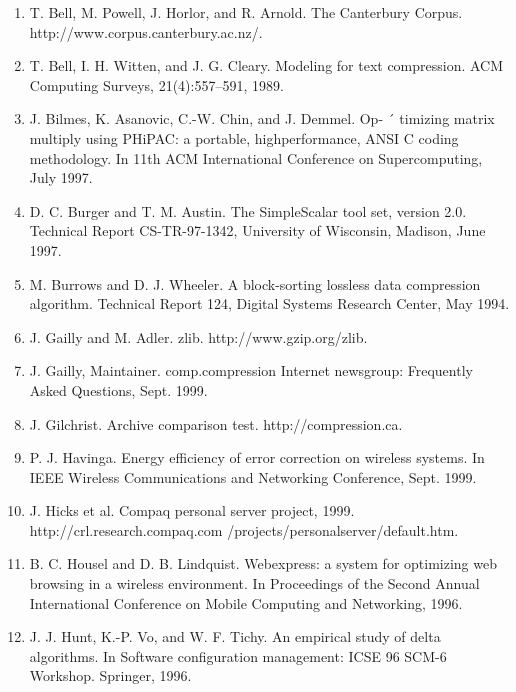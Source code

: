 \documentclass{article}
\begin{document}
\begin{enumerate}
	\item T. Bell, M. Powell, J. Horlor, and R. Arnold. The Canterbury Corpus. http://www.corpus.canterbury.ac.nz/.

	\item T. Bell, I. H. Witten, and J. G. Cleary. Modeling for text
	compression. ACM Computing Surveys, 21(4):557–591,
	1989.

	\item J. Bilmes, K. Asanovic, C.-W. Chin, and J. Demmel. Op- ´
	timizing matrix multiply using PHiPAC: a portable, highperformance, ANSI C coding methodology. In 11th ACM
	International Conference on Supercomputing, July 1997.
	
	\item D. C. Burger and T. M. Austin. The SimpleScalar tool
	set, version 2.0. Technical Report CS-TR-97-1342, University of Wisconsin, Madison, June 1997.
	
	\item M. Burrows and D. J. Wheeler. A block-sorting lossless
	data compression algorithm. Technical Report 124, Digital Systems Research Center, May 1994.
	
	\item J. Gailly and M. Adler. zlib. http://www.gzip.org/zlib.
	
	\item J. Gailly, Maintainer. comp.compression Internet
	newsgroup: Frequently Asked Questions, Sept. 1999.

	\item J. Gilchrist. Archive comparison test.
	http://compression.ca.
	
	\item P. J. Havinga. Energy efficiency of error correction on
	wireless systems. In IEEE Wireless Communications and
	Networking Conference, Sept. 1999.
	
	\item J. Hicks et al. Compaq personal server
	project, 1999. http://crl.research.compaq.com
	/projects/personalserver/default.htm.

	\item B. C. Housel and D. B. Lindquist. Webexpress: a system
	for optimizing web browsing in a wireless environment.
	In Proceedings of the Second Annual International Conference on Mobile Computing and Networking, 1996.

	\item J. J. Hunt, K.-P. Vo, and W. F. Tichy. An empirical study
	of delta algorithms. In Software configuration management: ICSE 96 SCM-6 Workshop. Springer, 1996.


\end{enumerate}
\end{document}

